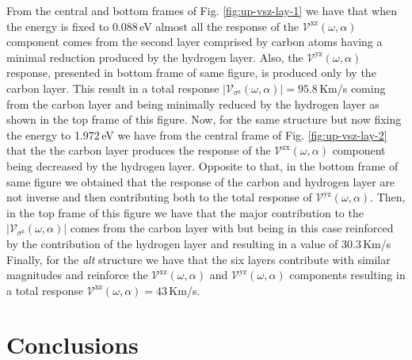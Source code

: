 \documentclass[prb,11pt,tightenlines,twocolumn,aps]{revtex4-1}
\begin{document}
{\color{blue} From the central and bottom frames of Fig. \ref{fig:up-vsz-lay-1}
we have that when the energy is fixed to 0.088\,eV almost all the response of
the $\mathcal{V}^{\mathrm{xz}}(\omega,\alpha)$ component comes from the second
layer comprised by carbon atoms having a minimal reduction produced by the
hydrogen layer. Also, the $\mathcal{V}^{\mathrm{yz}}(\omega,\alpha)$ response,
presented in bottom frame of same figure, is produced only by the carbon layer.
This result in a total response
$|\mathcal{V}_{\sigma^{\mathrm{z}}}(\omega,\alpha)| = 95.8$\,Km/s coming from
the carbon layer and being minimally reduced by the hydrogen layer as shown in
the top frame of this figure.
% 
Now, for the same structure but now fixing the energy to 1.972\,eV we have from
the central frame of Fig. \ref{fig:up-vsz-lay-2} that the the carbon layer
produces the response of the $\mathcal{V}^{\mathrm{zx}}(\omega,\alpha)$
component being decreased by the hydrogen layer. Opposite to that, in the
bottom frame of same figure we obtained that the response of the carbon and
hydrogen layer are not inverse and then contributing both to the total response
of $\mathcal{V}^{\mathrm{yz}}(\omega,\alpha)$. Then, in the top frame of this
figure we have that the major contribution to the
$|\mathcal{V}_{\sigma^{\mathrm{z}}}(\omega,\alpha)|$ comes from the carbon
layer with but being in this case reinforced by the contribution of the
hydrogen layer and resulting in a value of 30.3\,Km/s}
{\color{blue}
Finally, for the \emph{alt} structure we have that the six layers contribute
with similar magnitudes and reinforce the
$\mathcal{V}^{\mathrm{xz}}(\omega,\alpha)$ and
$\mathcal{V}^{\mathrm{yz}}(\omega,\alpha)$ components resulting in a total
response $\mathcal{V}^{\mathrm{xz}}(\omega,\alpha) = 43$\,Km/s.
}





\section{Conclusions} %
\label{sec:conclusions}



\end{document}
